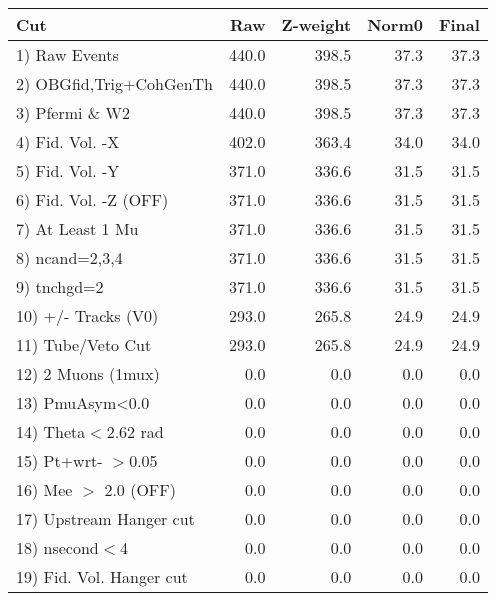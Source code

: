  \begin{table}[h!]\centering
 \begin{tabular}{||l||r|r|r|r||}
 \hline
 \hline
 Cut & Raw & Z-weight & Norm0 & Final \\
 \hline
  1) Raw Events           &       440.0 &       398.5 &        37.3 &        37.3 \\
  2) OBGfid,Trig+CohGenTh &       440.0 &       398.5 &        37.3 &        37.3 \\
  3) Pfermi \& W2         &       440.0 &       398.5 &        37.3 &        37.3 \\
  4) Fid. Vol. -X         &       402.0 &       363.4 &        34.0 &        34.0 \\
  5) Fid. Vol. -Y         &       371.0 &       336.6 &        31.5 &        31.5 \\
  6) Fid. Vol. -Z (OFF)   &       371.0 &       336.6 &        31.5 &        31.5 \\
  7) At Least 1 Mu        &       371.0 &       336.6 &        31.5 &        31.5 \\
  8) ncand=2,3,4          &       371.0 &       336.6 &        31.5 &        31.5 \\
  9) tnchgd=2             &       371.0 &       336.6 &        31.5 &        31.5 \\
 10) +/- Tracks (V0)      &       293.0 &       265.8 &        24.9 &        24.9 \\
 11) Tube/Veto Cut        &       293.0 &       265.8 &        24.9 &        24.9 \\
 12) 2 Muons (1mux)       &         0.0 &         0.0 &         0.0 &         0.0 \\
 13) PmuAsym<0.0          &         0.0 &         0.0 &         0.0 &         0.0 \\
 14) Theta$<$2.62 rad     &         0.0 &         0.0 &         0.0 &         0.0 \\
 15) Pt+wrt- $>$0.05      &         0.0 &         0.0 &         0.0 &         0.0 \\
 16) Mee $>$ 2.0  (OFF)   &         0.0 &         0.0 &         0.0 &         0.0 \\
 17) Upstream Hanger cut  &         0.0 &         0.0 &         0.0 &         0.0 \\
 18) nsecond$<$4          &         0.0 &         0.0 &         0.0 &         0.0 \\
 19) Fid. Vol. Hanger cut &         0.0 &         0.0 &         0.0 &         0.0 \\

\end{tabular}
\end{table}
